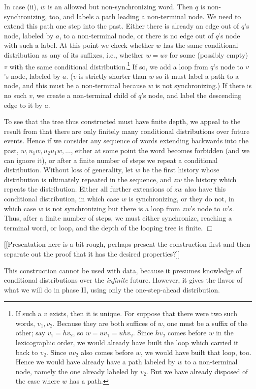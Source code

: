 \documentclass[../new-procedure.tex]{subfiles}
\begin{document}
In case (ii), $w$ is an allowed but non-synchronizing word.  Then $q$ is
non-synchronizing, too, and labels a path leading a non-terminal node.  We need
to extend this path one step into the past.  Either there is already an edge
out of $q$'s node, labeled by $a$, to a non-terminal node, or there is no edge
out of $q$'s node with such a label.  At this point we check whether $w$ has
the same conditional distribution as any of its suffixes, i.e., whether $w =
uv$ for some (possibly empty) $v$ with the same conditional
distribution.\footnote{If such a $v$ exists, then it is unique.  For suppose
  that there were two such words, $v_1, v_2$.  Because they are both suffices
  of $w$, one must be a suffix of the other; say $v_1 = h v_2$, so $w = u v_1 =
  u h v_2$.  Since $h v_2$ comes before $w$ in the lexicographic order, we
  would already have built the loop which carried it back to $v_2$.  Since $u
  v_2$ also comes before $w$, we would have built that loop, too.  Hence we
  would have already have a path labeled by $w$ to a non-terminal node, namely
  the one already labeled by $v_2$.  But we have already disposed of the case
  where $w$ has a path.}  If so, we add a loop from $q$'s node to $v$'s node,
labeled by $a$.  ($v$ is strictly shorter than $w$ so it must label a path to a
node, and this must be a non-terminal because $w$ is not synchronizing.)  If
there is no such $v$, we create a non-terminal child of $q$'s node, and label
the descending edge to it by $a$.

To see that the tree thus constructed must have finite depth, we appeal to the
result from \cite{Kitchens-Tuncel} that there are only finitely many
conditional distributions over future events.  Hence if we consider any
sequence of words extending backwards into the past, $w, u_1 w, u_2 u_1 w,
\ldots$, either at some point the word becomes forbidden (and we can ignore
it), or after a finite number of steps we repeat a conditional distribution.
Without loss of generality, let $w$ be the first history whose distribution is
ultimately repeated in the sequence, and $zw$ the history which repeats the
distribution.  Either all further extensions of $zw$ also have this conditional
distribution, in which case $w$ is synchronizing, or they do not, in which case
$w$ is not synchronizing but there is a loop from $zw$'s node to $w$'s.  Thus,
after a finite number of steps, we must either synchronize, reaching a terminal word, or loop, and the depth of the looping tree is finite.
$\Box$


[[Presentation here is a bit rough, perhaps present the construction first and
then separate out the proof that it has the desired properties?]]

This construction cannot be used with data, because it presumes knowledge of
conditional distributions over the {\em infinite} future.  However, it gives
the flavor of what we will do in phase II, using only the one-step-ahead
distribution.
\end{document}

